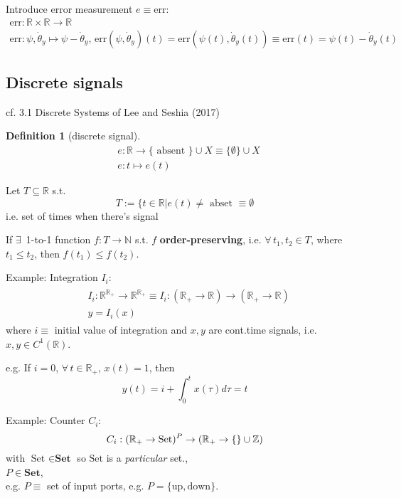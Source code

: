 \documentclass[10pt]{amsart}
\newtheorem{definition}{Definition}
\begin{document}
\begin{multicols*}{2}
Introduce error measurement $e\equiv \text{err}$:
\[
\begin{gathered}
	\text{err}:\mathbb{R} \times \mathbb{R} \to \mathbb{R} \\ 
\text{err}:\psi,\dot{\theta}_y \mapsto \psi- \dot{\theta}_y, \, \text{err}(\psi,\dot{\theta}_y)(t) = \text{err}(\psi(t),\dot{\theta}_y(t)) \equiv \text{err}(t) = \psi(t) - \dot{\theta}_y(t)
\end{gathered}
\]

\subsection{Discrete signals}

cf. 3.1 Discrete Systems of Lee and Seshia (2017) \cite{LeSe2017}

\begin{definition}[discrete signal]
\begin{equation}
\begin{aligned}
& e:\mathbb{R} \to \lbrace \text{ absent } \rbrace \cup X \equiv \lbrace \emptyset \rbrace \cup X \\ 
& e:t\mapsto e(t)
\end{aligned}
\end{equation}
\end{definition}

Let $T\subseteq \mathbb{R}$ s.t. 
\[
T:= \lbrace t\in \mathbb{R} | e(t) \neq \text{ abset } \equiv \emptyset 
\]
i.e. set of times when there's signal  

If $\exists \, $ 1-to-1 function $f:T\to \mathbb{N}$ s.t. $f$ \textbf{order-preserving}, i.e. $\forall \, t_1, t_2 \in T$, where $t_1\leq t_2$, then $f(t_1) \leq f(t_2)$.  

Example: Integration $I_i$: 
\[
\begin{gathered}
	\begin{aligned}
	& I_i: \mathbb{R}^{\mathbb{R}_+} \to \mathbb{R}^{\mathbb{R}_+} \equiv I_i : (\mathbb{R}_+ \to \mathbb{R}) \to (\mathbb{R}_+ \to \mathbb{R}) \\ 
	& y= I_i(x)
\end{aligned}
\end{gathered}
\]
where $i\equiv $ initial value of integration and $x,y$ are cont.time signals, i.e. $x,y \in C^1(\mathbb{R})$.  

e.g. If $i=0$, $\forall \, t \in \mathbb{R}_+$, $x(t) = 1$, then 
\[
y(t) = i+ \int_0^t x(\tau) d\tau = t
\]

Example: Counter $C_i$: 
\[
C_i: (\mathbb{R}_+ \to \text{Set})^P \to (\mathbb{R}_+ \to \lbrace \empty \rbrace \cup \mathbb{Z} )
\]
with $\text{Set } \in \textbf{Set}$ so $\text{Set}$ is a \emph{particular} set., \\
$P\in \textbf{Set}$, \\
e.g. $P\equiv $ set of input ports, e.g. $P=\lbrace \text{up}, \text{down} \rbrace$.  


\end{multicols*}
\end{document}
